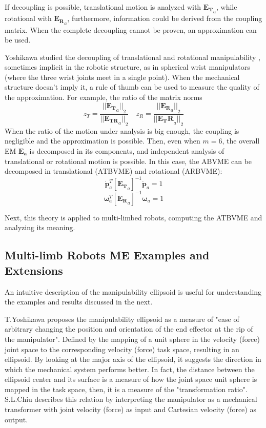 If decoupling is possible, translational motion is analyzed with $\mathbf{E_T}_a$, while rotational with $\mathbf{E_R}_a$, furthermore, information could be derived from the coupling matrix. When the complete decoupling cannot be proven, an approximation can be used.

Yoshikawa studied the decoupling of translational and rotational manipulability \cite{TRManipulability}, sometimes implicit in the robotic structure, as in spherical wrist manipulators  (where the three wrist joints meet in a single point). When the mechanical structure doesn't imply it, a rule of thumb can be used to measure the quality of the approximation.
For example, the ratio of the matrix norms
\begin{equation*}
z_T = \frac{{||\mathbf{E_T}_a||}_2}{{||\mathbf{E_{TR}}_a||}_2} \quad
z_R = \frac{{||\mathbf{E_R}_a||}_2}{{||\mathbf{E_TR}_a||}_2} 
\end{equation*}
When the ratio of the motion under analysis is big enough, the coupling is negligible and the approximation is possible. 
Then, even when $m = 6$, the overall EM $\mathbf{E_a}$ is decomposed in its components, and independent analysis of translational or rotational motion is possible.
In this case, the ABVME can be decomposed in translational (ATBVME) and rotational (ARBVME):
\begin{equation}
    \mathbf{\dot{p}}^T_a [\mathbf{E_T}_a]^{-1}\mathbf{\dot{p}}_a = 1
    \label{eq:ATBVME}
\end{equation}
\begin{equation}
    \mathbf{\omega}^T_a [\mathbf{E_R}_a]^{-1}\mathbf{\omega}_a = 1
    \label{eq:ARBVME}
\end{equation}

Next, this theory is applied to multi-limbed robots, computing the ATBVME and analyzing its meaning.

\subsection{Multi-limb Robots ME Examples and Extensions}
\label{sec:ME_multi_limb_example}

An intuitive description of the manipulability ellipsoid is useful for understanding the examples and results discussed in the next.

T.Yoshikawa\cite{TRManipulability} proposes the manipulability ellipsoid as a measure of "ease of arbitrary changing the position and orientation of the end effector at the rip of the manipulator". Defined by the mapping of a unit sphere in the velocity (force) joint space to the corresponding velocity (force) task space, resulting in an ellipsoid. By looking at the major axis of the ellipsoid, it suggests the direction in which the mechanical system performs better. In fact, the distance between the ellipsoid center and its surface is a measure of how the joint space unit sphere is mapped in the task space, then, it is a measure of the "transformation ratio".
S.L.Chiu describes\cite{TaskCompatibilityPosture} this relation by interpreting the manipulator as a mechanical transformer with joint velocity (force) as input and Cartesian velocity (force) as output. 


